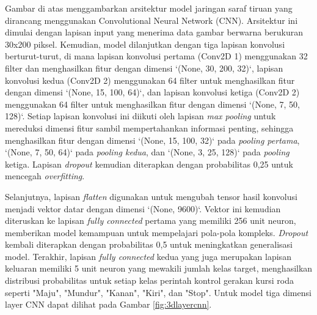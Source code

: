 Gambar di atas menggambarkan arsitektur model jaringan saraf tiruan yang dirancang menggunakan Convolutional Neural Network (CNN). Arsitektur ini dimulai dengan lapisan input yang menerima data gambar berwarna berukuran 30x200 piksel. Kemudian, model dilanjutkan dengan tiga lapisan konvolusi berturut-turut, di mana lapisan konvolusi pertama (Conv2D 1) menggunakan 32 filter dan menghasilkan fitur dengan dimensi `(None, 30, 200, 32)`, lapisan konvolusi kedua (Conv2D 2) menggunakan 64 filter untuk menghasilkan fitur dengan dimensi `(None, 15, 100, 64)`, dan  lapisan konvolusi ketiga (Conv2D 2) menggunakan 64 filter untuk menghasilkan fitur dengan dimensi `(None, 7, 50, 128)`. Setiap lapisan konvolusi ini diikuti oleh lapisan \emph{max pooling} untuk mereduksi dimensi fitur sambil mempertahankan informasi penting, sehingga menghasilkan fitur dengan dimensi `(None, 15, 100, 32)` pada \emph{pooling pertama}, `(None, 7, 50, 64)` pada \emph{pooling kedua}, dan `(None, 3, 25, 128)` pada \emph{pooling} ketiga. Lapisan \emph{dropout} kemudian diterapkan dengan probabilitas 0,25 untuk mencegah \emph{overfitting}.

Selanjutnya, lapisan \emph{flatten} digunakan untuk mengubah tensor hasil konvolusi menjadi vektor datar dengan dimensi `(None, 9600)`. Vektor ini kemudian diteruskan ke lapisan \emph{fully connected} pertama yang memiliki 256 unit neuron, memberikan model kemampuan untuk mempelajari pola-pola kompleks. \emph{Dropout} kembali diterapkan dengan probabilitas 0,5 untuk meningkatkan generalisasi model. Terakhir, lapisan \emph{fully connected} kedua yang juga merupakan lapisan keluaran memiliki 5 unit neuron yang mewakili jumlah kelas target, menghasilkan distribusi probabilitas untuk setiap kelas perintah kontrol gerakan kursi roda seperti "Maju", "Mundur", "Kanan", "Kiri", dan "Stop". Untuk model tiga dimensi layer CNN dapat dilihat pada Gambar \ref{fig:3dlayercnn}.

